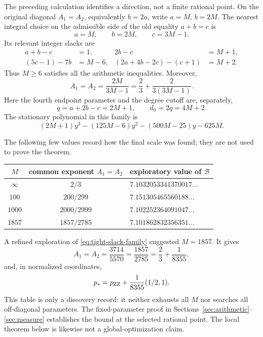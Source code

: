 \documentclass[11pt,reqno,letterpaper]{amsart}
\numberwithin{equation}{section}
\theoremstyle{definition}
\theoremstyle{remark}
\begin{document}
The preceding calculation identifies a direction, not a finite rational
point.  On the original diagonal \(A_1=A_2\), equivalently \(b=2a\),
write \(a=M\), \(b=2M\).  The nearest integral choice on the admissible
side of the old equality \(a+b=c\) is
\begin{equation}\label{eq:tight-slack-family}
 a=M,\qquad b=2M,\qquad c=3M-1.
\end{equation}
Its relevant integer slacks are
\begin{align*}
 a+b-c&=1,&2b-c&=M+1,\\
 (5c-1)-7b&=M-6,
 &(2a+4b-2c)-(c+1)&=M+2.
\end{align*}
Thus \(M\geq6\) satisfies all the arithmetic inequalities.  Moreover,
\begin{equation}\label{eq:tight-slack-exponent}
 A_1=A_2=\frac{2M}{3M-1}
 =\frac23+\frac{2}{3(3M-1)}.
\end{equation}
Here the fourth endpoint parameter and the degree cutoff are, separately,
\begin{equation}\label{eq:tight-slack-q-d0}
 q=a+2b-c=2M+1,\qquad d_0=2q=4M+2.
\end{equation}
The stationary polynomial in this family is
\begin{equation}\label{eq:tight-slack-stationary}
 (2M+1)y^3-(125M-6)y^2-(500M-25)y-625M.
\end{equation}

The following few values record how the final scale was found; they are
not used to prove the theorem.
\begin{center}
\begin{tabular}{ccl}
\toprule
\(M\)&common exponent \(A_1=A_2\)&exploratory value of \(\mathcal B\)\\
\midrule
\(\infty\)&\(2/3\)&\(7.1032053341370017\ldots\)\\
\(100\)&\(200/299\)&\(7.151305465560188\ldots\)\\
\(1000\)&\(2000/2999\)&\(7.102252364091047\ldots\)\\
\(1857\)&\(1857/2785\)&\(7.101862832356351\ldots\)\\
\bottomrule
\end{tabular}
\end{center}
A refined exploration of \eqref{eq:tight-slack-family} suggested
\(M=1857\).  It gives
\begin{equation}\label{eq:new-exponent-from-family}
 A_1=A_2=\frac{3714}{5570}=\frac{1857}{2785}
 =\frac23+\frac1{8355},
\end{equation}
and, in normalized coordinates,
\begin{equation}\label{eq:new-point-old-direction}
 p_*=p_{\rm ZZ}+\frac1{8355}(1/2,1).
\end{equation}
This table is only a discovery record: it neither exhausts all \(M\)
nor searches all off-diagonal parameters.  The fixed-parameter proof in
Sections~\ref{sec:arithmetic}--\ref{sec:measure} establishes the bound at
the selected rational point.  The local theorem below is likewise not a
global-optimization claim.
\end{document}
